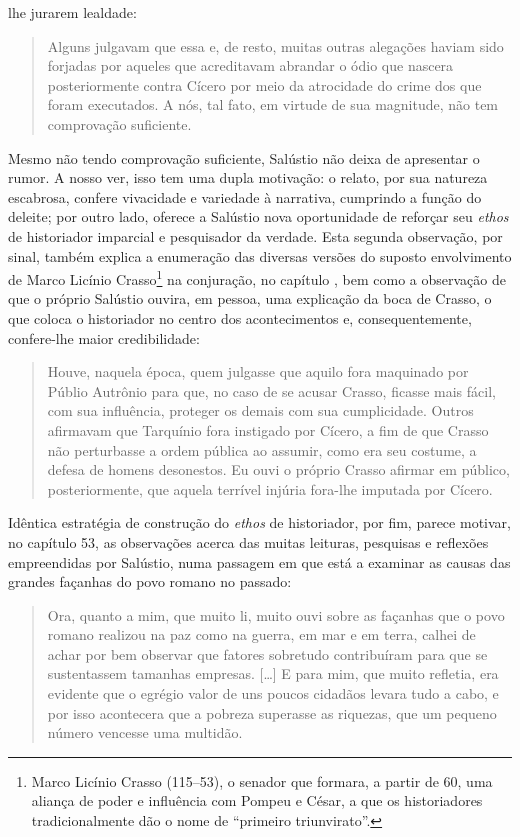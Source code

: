  lhe jurarem lealdade: \begin{quote} Alguns julgavam que essa e, de resto, muitas
   outras alegações haviam sido forjadas por aqueles que acreditavam abrandar o
   ódio que nascera posteriormente contra Cícero por meio da atrocidade do
   crime dos que foram executados. A nós, tal fato, em virtude de sua
   magnitude, não tem comprovação suficiente.  \end{quote} Mesmo não tendo
   comprovação suficiente, Salústio não deixa de apresentar o rumor. A nosso
   ver, isso tem uma dupla motivação: o relato, por sua natureza escabrosa,
   confere vivacidade e variedade à narrativa, cumprindo a função do deleite;
   por outro lado, oferece a Salústio nova oportunidade de reforçar seu
   \emph{ethos} de historiador imparcial e pesquisador da verdade. Esta segunda
   observação, por sinal, também explica a enumeração das diversas versões do
   suposto envolvimento de Marco Licínio Crasso\footnote{Marco Licínio Crasso
   (115--53), o senador que formara, a partir de 60, uma aliança de
 poder e influência com Pompeu e César, a que os historiadores tradicionalmente
 dão o nome de “primeiro  triunvirato”.} na conjuração, no capítulo , bem
 como a observação de que o próprio Salústio ouvira, em pessoa, uma explicação
 da boca de Crasso, o que coloca o historiador no centro dos acontecimentos e,
 consequentemente, confere-lhe maior credibilidade: \begin{quote} Houve,
   naquela época, quem julgasse que aquilo fora maquinado por Públio Autrônio
   para que, no caso de se acusar Crasso, ficasse mais fácil, com sua
   influência, proteger os demais com sua cumplicidade. Outros afirmavam que
   Tarquínio fora instigado por Cícero, a fim de que Crasso não perturbasse a
   ordem pública ao assumir, como era seu costume, a defesa de homens
   desonestos. Eu ouvi o próprio Crasso afirmar em público, posteriormente, que
   aquela terrível injúria fora-lhe imputada por Cícero.  \end{quote} Idêntica
   estratégia de construção do \emph{ethos} de historiador, por fim, parece
   motivar, no capítulo 53, as observações acerca das muitas leituras,
   pesquisas e reflexões empreendidas por Salústio, numa passagem em que está a
   examinar as causas das grandes façanhas do povo romano no passado:
   \begin{quote} Ora, quanto a mim, que muito li, muito ouvi sobre as façanhas que o
     povo romano realizou na paz como na guerra, em mar e em terra, calhei de
     achar por bem observar que fatores sobretudo contribuíram para que se
     sustentassem tamanhas empresas. [\ldots{}] E para mim, que muito refletia, era
     evidente que o egrégio valor de uns poucos cidadãos levara tudo a cabo, e
     por isso acontecera que a pobreza superasse as riquezas, que um pequeno
     número vencesse uma multidão.  \end{quote}



